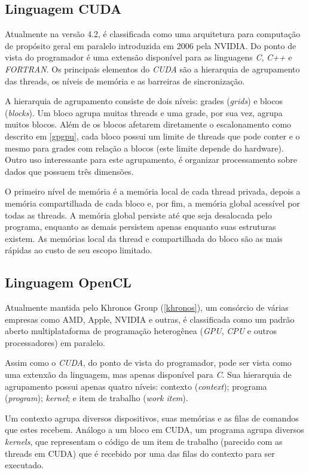   \subsection{Linguagem CUDA}
  Atualmente na versão 4.2, é classificada como uma arquitetura para computação de propósito geral em paralelo introduzida em 2006 pela NVIDIA. Do ponto de vista do programador é uma extensão disponível para as linguagens \textit{C}, \textit{C++} e \textit{FORTRAN}. Os principais elementos do \textit{CUDA} são a hierarquia de agrupamento das threads, os níveis de memória e as barreiras de sincronização.
  
  A hierarquia de agrupamento consiste de dois níveis: grades (\textit{grids}) e blocos (\textit{blocks}). Um bloco agrupa muitas threads e uma grade, por sua vez, agrupa muitos blocos. Além de os blocos afetarem diretamente o escalonamento como descrito em \ref{gpgpu}, cada bloco possui um limite de threads que pode conter e o mesmo para grades com relação a blocos (este limite depende do hardware). Outro uso interessante para este agrupamento, é organizar processamento sobre dados que possuem três dimensões.
  
  O primeiro nível de memória é a memória local de cada thread privada, depois a memória compartilhada de cada bloco e, por fim, a memória global acessível por todas as threads. A memória global persiste até que seja desalocada pelo programa, enquanto as demais persistem apenas enquanto suas estruturas existem. As memórias local da thread e compartilhada do bloco são as mais rápidas ao custo de seu escopo limitado.
    
  \subsection{Linguagem OpenCL}
  Atualmente mantida pelo Khronos Group (\ref{khronos}), um consórcio de várias empresas como AMD, Apple, NVIDIA e outras, é classificada como um padrão aberto multiplataforma de programação heterogênea (\textit{GPU}, \textit{CPU} e outros processadores) em paralelo.
  
  Assim como o \textit{CUDA}, do ponto de vista do programador, pode ser vista como uma extenxão da linguagem, mas apenas disponível para \textit{C}. Sua hierarquia de agrupamento possui apenas quatro níveis: contexto (\textit{context}); programa (\textit{program}); \textit{kernel}; e item de trabalho (\textit{work item}).
  
  Um contexto agrupa diversos dispositivos, suas memórias e as filas de comandos que estes recebem. Análogo a um bloco em CUDA, um programa agrupa diversos \textit{kernels}, que representam o código de um item de trabalho (parecido com as threads em CUDA) que é recebido por uma das filas do contexto para ser executado.
  

